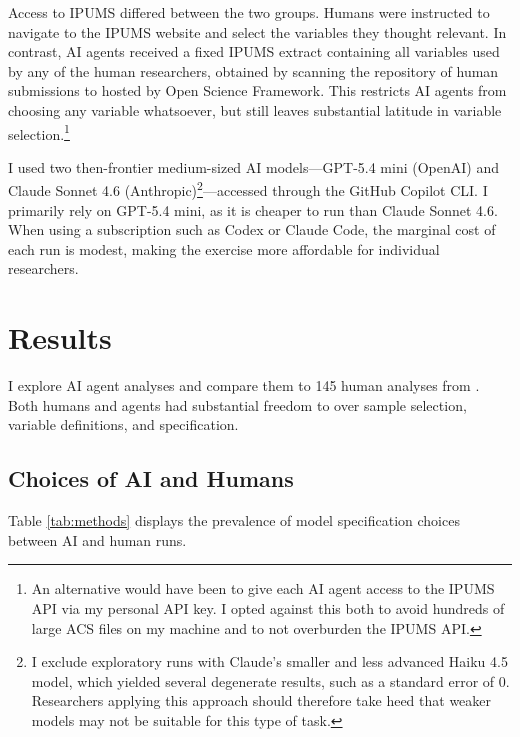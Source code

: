 \documentclass[
  12pt]{article}
\begin{document}
Access to IPUMS differed between the two groups. Humans were instructed
to navigate to the IPUMS website and select the variables they thought
relevant. In contrast, AI agents received a fixed IPUMS extract
containing all variables used by any of the human researchers, obtained
by scanning the repository of human submissions to
\citet{huntingtonklein2025sources} hosted by Open Science Framework.
This restricts AI agents from choosing any variable whatsoever, but
still leaves substantial latitude in variable
selection.\footnote{An alternative would have been to give each AI agent access to the IPUMS API via my personal API key. I opted against this both to avoid hundreds of large ACS files on my machine and to not overburden the IPUMS API.}

I used two then-frontier medium-sized AI models---GPT-5.4 mini (OpenAI)
and Claude Sonnet 4.6
(Anthropic)\footnote{I exclude \aiExcludedModelRuns{} exploratory runs with Claude's smaller and less advanced Haiku 4.5 model, which yielded several degenerate results, such as a standard error of 0. Researchers applying this approach should therefore take heed that weaker models may not be suitable for this type of task.}---accessed
through the GitHub Copilot CLI. I primarily rely on GPT-5.4 mini, as it
is cheaper to run than Claude Sonnet 4.6. When using a subscription such
as Codex or Claude Code, the marginal cost of each run is modest, making
the exercise more affordable for individual researchers.

\section{Results}\label{sec-results}

I explore \aiAnalyticN{} AI agent analyses and compare them to 145 human
analyses from \citet{huntingtonklein2025sources}. Both humans and agents
had substantial freedom to over sample selection, variable definitions,
and specification.

\subsection{Choices of AI and Humans}\label{choices-of-ai-and-humans}

Table \ref{tab:methods} displays the prevalence of model specification
choices between AI and human runs.
\end{document}
